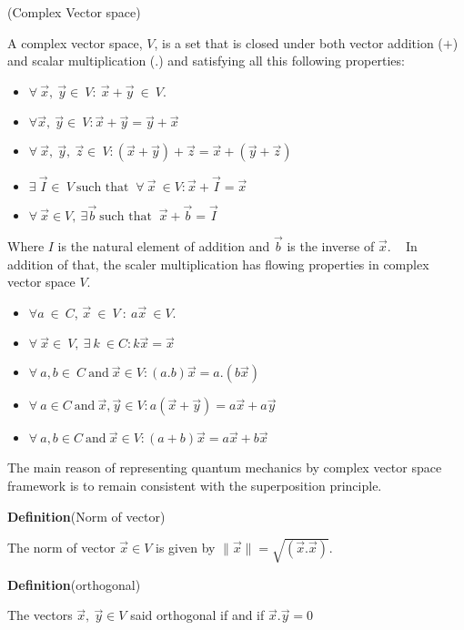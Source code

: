  \begin{defn}{(Complex Vector space)}

A complex vector space, $V$, is a set that is closed under both vector addition
($ +$) and scalar multiplication (.) and satisfying all this following properties:
\begin{itemize}
\item $\forall~ \vec{x},~\vec{y} \in ~ V : ~\vec{x}+\vec{y} ~\in~ V $.
\item $\forall \vec{x},~\vec{y} \in ~ V : \vec{x}+\vec{y}=\vec{y}+\vec{x}$
\item $\forall~ \vec{x},~\vec{y}, ~\vec{z} \in ~ V:\left(\vec{x}+\vec{y}\right)+\vec{z}=\vec{x}+\left(\vec{y}+\vec{z}\right)$
\item $\exists ~\vec{I} \in ~V~ \text{such that }~  \forall~ \vec{x} ~\in  V: \vec{x}+\vec{I}=\vec{x}$
\item $\forall ~\vec{x} \in V,~ \exists \vec{b} ~ \text{such that }  ~\vec{x}+\vec{b}= \vec{I}$
\end{itemize}
Where $I$ is the natural element of addition and $\vec{b}$ is the inverse of $\vec{x}$. ~
In addition  of that, the scaler  multiplication has flowing properties in complex vector space $V$.
\begin{itemize}
\item $\forall a~\in ~C$, $\vec{x}~\in ~V~ :~ a\vec{x}~ \in V$.
\item $\forall ~\vec{x} \in ~V,~ \exists~ k ~\in C :k\vec{x}=\vec{x}$
\item $\forall ~ a,b \in ~C ~\text{and} ~ \vec{x}\in V :\left(a.b\right) \vec{x}=a.\left(b \vec{x}\right)$
\item $\forall ~ a \in C ~\text{and} ~ \vec{x}, \vec{y}\in V:a\left(\vec{x}+\vec{y}\right)=a\vec{x}+a\vec{y}$
\item $\forall ~ a,b \in C ~\text{and} ~ \vec{x}\in V:\left(a+b\right)\vec{x}=a\vec{x}+b\vec{x}$
\end{itemize}
\end{defn}
The main reason of representing quantum mechanics by complex  vector space framework is to remain consistent with the superposition principle.

\textbf{Definition}{(Norm of vector)}

The norm of vector $\vec{x} \in V$ is given by $\parallel \vec{x}\parallel=\sqrt{\left(\vec{x}.\vec{x}\right)}$.

\textbf{Definition}{(orthogonal)}

The vectors $\vec{x},~ \vec{y} \in V$ said orthogonal if and if $\vec{x}.\vec{y}=0$

